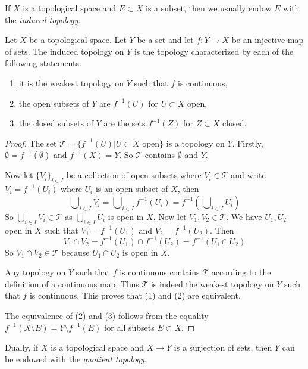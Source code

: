 \noindent
If $X$ is a topological space and $E \subset X$ is a subset, then
we usually endow $E$ with the {\it induced topology}.

\begin{lemma}
\label{lemma-induced}
Let $X$ be a topological space. Let $Y$ be a set and let
$f : Y \to X$ be an injective map of sets. The induced
topology on $Y$ is the topology characterized by
each of the following statements:
\begin{enumerate}
\item it is the weakest topology on $Y$ such that $f$ is continuous,
\item the open subsets of $Y$ are $f^{-1}(U)$ for $U \subset X$ open,
\item the closed subsets of $Y$ are the sets $f^{-1}(Z)$ for $Z \subset X$
closed.
\end{enumerate}
\end{lemma}

\begin{proof}
The set $\mathcal{T} = \{f^{-1}(U) | U \subset X \text{ open}\}$ is a
topology on $Y$. Firstly, $\emptyset = f^{-1}(\emptyset)$ and $f^{-1}(X) = Y$.
So $\mathcal{T}$ contains $\emptyset$ and $Y$.

\medskip\noindent
Now let $\{V_i\}_{i \in I}$ be a collection of open subsets where
$V_i \in \mathcal{T}$ and write $V_i = f^{-1}(U_i)$ where $U_i$
is an open subset of $X$, then
$$
\bigcup\nolimits_{i\in I} V_i =
\bigcup\nolimits_{i\in I} f^{-1}(U_i) =
f^{-1}\left(\bigcup\nolimits_{i\in I} U_i\right)
$$
So $\bigcup_{i\in I} V_i \in \mathcal{T}$ as $\bigcup_{i\in I} U_i$
is open in $X$.
Now let $V_1, V_2 \in \mathcal{T}$. We have $U_1, U_2$ open in $X$
such that $V_1 = f^{-1}(U_1)$ and $V_2 = f^{-1}(U_2)$. Then
$$
V_1 \cap V_2 = f^{-1}(U_1) \cap f^{-1}(U_2) = f^{-1}(U_1 \cap U_2)
$$
So $V_1 \cap V_2 \in \mathcal{T}$ because $U_1 \cap U_2$ is open in $X$.

\medskip\noindent
Any topology on $Y$ such that $f$ is continuous contains
$\mathcal{T}$ according to the definition of a continuous map.
Thus $\mathcal{T}$ is indeed
the weakest topology on $Y$ such that $f$ is continuous.
This proves that (1) and (2) are equivalent.

\medskip\noindent
The equivalence of (2) and (3) follows from the equality
$f^{-1}(X \setminus E) = Y \setminus f^{-1}(E)$ for all subsets
$E \subset X$.
\end{proof}

\noindent
Dually, if $X$ is a topological space and $X \to Y$ is a surjection of
sets, then $Y$ can be endowed with the {\it quotient topology}.

